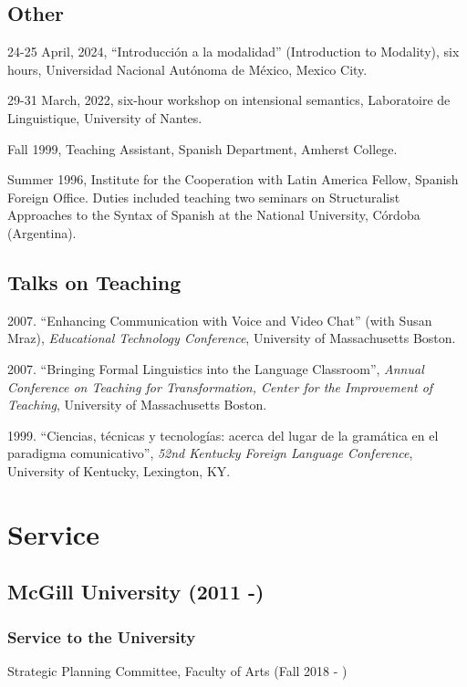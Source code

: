 \documentclass[11pt]{article}
\begin{document}
\subsection*{\textbf{Other}}


24-25 April, 2024, ``Introducci\'on a la modalidad'' (Introduction to Modality), six hours, Universidad Nacional Aut\'onoma de M\'exico, Mexico City.

29-31 March, 2022, six-hour workshop on intensional semantics, Laboratoire de Linguistique, University of Nantes. 

Fall 1999, Teaching Assistant, Spanish Department, Amherst College.

Summer 1996,  Institute for the Cooperation with Latin America Fellow,  Spanish Foreign Office. Duties included teaching two seminars on Structuralist Approaches to the Syntax of Spanish at the National University, C\'ordoba (Argentina).


\subsection*{Talks on Teaching}


2007. ``Enhancing Communication with Voice and Video Chat'' (with Susan Mraz), \textit{Educational Technology Conference}, University of Massachusetts Boston.

2007. ``Bringing Formal Linguistics into the Language Classroom'', \textit{Annual Conference on Teaching for Transformation, Center for the Improvement of Teaching}, University of Massachusetts Boston.

1999. ``Ciencias, t\'ecnicas y tecnolog\'ias: acerca del lugar de la gram\'atica en el paradigma comunicativo'', \textit{52nd Kentucky Foreign Language Conference}, University of Kentucky, Lexington, KY.

\section*{Service}

\subsection*{McGill University (2011 -)}

\subsubsection*{Service to the University}

Strategic Planning Committee, Faculty of Arts (Fall 2018 - )
\end{document}
